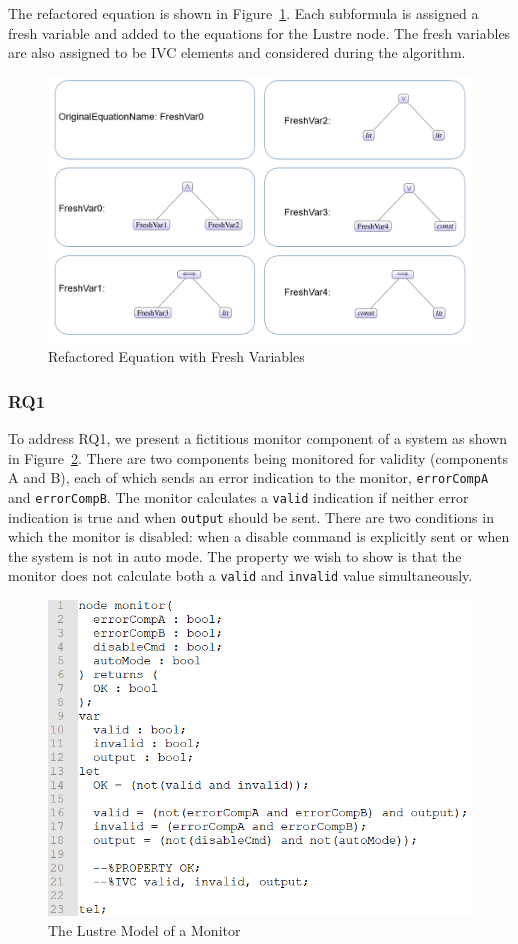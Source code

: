 The refactored equation is shown in Figure~\ref{fig:freshVarsRename}. Each subformula is assigned a fresh variable and added to the equations for the Lustre node. The fresh variables are also assigned to be IVC elements and considered during the \aivcalg algorithm. 

\begin{figure}[h!]
\begin{center}
\includegraphics[width=.7\textwidth]{images/freshVars.PNG}
\caption{Refactored Equation with Fresh Variables} \label{fig:freshVarsRename}
\end{center}
\end{figure} 

\subsubsection{RQ1}
To address RQ1, we present a fictitious monitor component of a system as shown in Figure~\ref{fig:monitorLustre}. There are two components being monitored for validity (components A and B), each of which sends an error indication to the monitor, \texttt{errorCompA} and \texttt{errorCompB}. The monitor calculates  a \texttt{valid} indication if neither error indication is true and when \texttt{output} should be sent. There are two conditions in which the monitor is disabled: when a disable command is explicitly sent or when the system is not in auto mode. The property we wish to show is that the monitor does not calculate both a \texttt{valid} and \texttt{invalid} value simultaneously. 
\begin{figure}[h!]
\begin{center}
\includegraphics[width=.8\textwidth]{images/monitorLustre.PNG}
\caption{The Lustre Model of a Monitor} 
\label{fig:monitorLustre}
\end{center}
\end{figure} 

